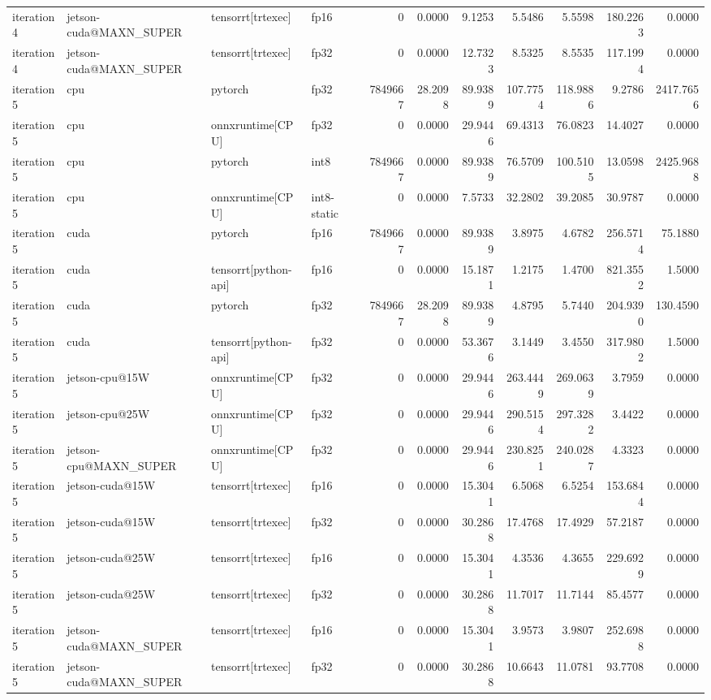 \begin{table}
\begin{tabular}{llllrrrrrrr}
iteration4 & jetson-cuda@MAXN\_SUPER & tensorrt[trtexec] & fp16 & 0 & 0.0000 & 9.1253 & 5.5486 & 5.5598 & 180.2263 & 0.0000 \\
iteration4 & jetson-cuda@MAXN\_SUPER & tensorrt[trtexec] & fp32 & 0 & 0.0000 & 12.7323 & 8.5325 & 8.5535 & 117.1994 & 0.0000 \\
iteration5 & cpu & pytorch & fp32 & 7849667 & 28.2098 & 89.9389 & 107.7754 & 118.9886 & 9.2786 & 2417.7656 \\
iteration5 & cpu & onnxruntime[CPU] & fp32 & 0 & 0.0000 & 29.9446 & 69.4313 & 76.0823 & 14.4027 & 0.0000 \\
iteration5 & cpu & pytorch & int8 & 7849667 & 0.0000 & 89.9389 & 76.5709 & 100.5105 & 13.0598 & 2425.9688 \\
iteration5 & cpu & onnxruntime[CPU] & int8-static & 0 & 0.0000 & 7.5733 & 32.2802 & 39.2085 & 30.9787 & 0.0000 \\
iteration5 & cuda & pytorch & fp16 & 7849667 & 0.0000 & 89.9389 & 3.8975 & 4.6782 & 256.5714 & 75.1880 \\
iteration5 & cuda & tensorrt[python-api] & fp16 & 0 & 0.0000 & 15.1871 & 1.2175 & 1.4700 & 821.3552 & 1.5000 \\
iteration5 & cuda & pytorch & fp32 & 7849667 & 28.2098 & 89.9389 & 4.8795 & 5.7440 & 204.9390 & 130.4590 \\
iteration5 & cuda & tensorrt[python-api] & fp32 & 0 & 0.0000 & 53.3676 & 3.1449 & 3.4550 & 317.9802 & 1.5000 \\
iteration5 & jetson-cpu@15W & onnxruntime[CPU] & fp32 & 0 & 0.0000 & 29.9446 & 263.4449 & 269.0639 & 3.7959 & 0.0000 \\
iteration5 & jetson-cpu@25W & onnxruntime[CPU] & fp32 & 0 & 0.0000 & 29.9446 & 290.5154 & 297.3282 & 3.4422 & 0.0000 \\
iteration5 & jetson-cpu@MAXN\_SUPER & onnxruntime[CPU] & fp32 & 0 & 0.0000 & 29.9446 & 230.8251 & 240.0287 & 4.3323 & 0.0000 \\
iteration5 & jetson-cuda@15W & tensorrt[trtexec] & fp16 & 0 & 0.0000 & 15.3041 & 6.5068 & 6.5254 & 153.6844 & 0.0000 \\
iteration5 & jetson-cuda@15W & tensorrt[trtexec] & fp32 & 0 & 0.0000 & 30.2868 & 17.4768 & 17.4929 & 57.2187 & 0.0000 \\
iteration5 & jetson-cuda@25W & tensorrt[trtexec] & fp16 & 0 & 0.0000 & 15.3041 & 4.3536 & 4.3655 & 229.6929 & 0.0000 \\
iteration5 & jetson-cuda@25W & tensorrt[trtexec] & fp32 & 0 & 0.0000 & 30.2868 & 11.7017 & 11.7144 & 85.4577 & 0.0000 \\
iteration5 & jetson-cuda@MAXN\_SUPER & tensorrt[trtexec] & fp16 & 0 & 0.0000 & 15.3041 & 3.9573 & 3.9807 & 252.6988 & 0.0000 \\
iteration5 & jetson-cuda@MAXN\_SUPER & tensorrt[trtexec] & fp32 & 0 & 0.0000 & 30.2868 & 10.6643 & 11.0781 & 93.7708 & 0.0000 \\
\bottomrule
\end{tabular}
\end{table}
